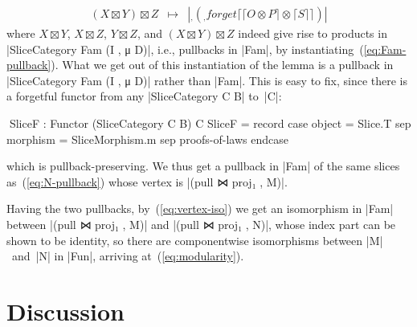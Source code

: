 \begin{itemize}
\[\begin{array}{rcl}
(X \boxtimes Y) \boxtimes Z  & \mapsto & |_ , (_ , forget ⌈ ⌈ O ⊗ P ⌉ ⊗ ⌈ S ⌉ ⌉)|
\end{array} \]
where $X \boxtimes Y$, $X \boxtimes Z$, $Y \boxtimes Z$, and $(X \boxtimes Y) \boxtimes Z$ indeed give rise to products in |SliceCategory Fam (I , μ D)|, i.e., pullbacks in |Fam|, by instantiating~(\ref{eq:Fam-pullback}).
What we get out of this instantiation of the lemma is a pullback in |SliceCategory Fam (I , μ D)| rather than |Fam|.
This is easy to fix, since there is a forgetful functor from any |SliceCategory C B| to~|C|:
\begin{code}
^^^SliceF : Functor (SliceCategory C B) C
SliceF = record  case  object    = Slice.T
                 sep   morphism  = SliceMorphism.m
                 sep   proofs-of-laws endcase
\end{code}
which is pullback-preserving.
We thus get a pullback in |Fam| of the same slices as~(\ref{eq:N-pullback}) whose vertex is |(pull ⋈ proj₁ , M)|.

\end{itemize}

Having the two pullbacks, by~(\ref{eq:vertex-iso}) we get an isomorphism in |Fam| between |(pull ⋈ proj₁ , M)| and |(pull ⋈ proj₁ , N)|, whose index part can be shown to be identity, so there are componentwise isomorphisms between |M|~and~|N| in |Fun|, arriving at~(\ref{eq:modularity}).

\section{Discussion}
\label{sec:categorical-discussion}

